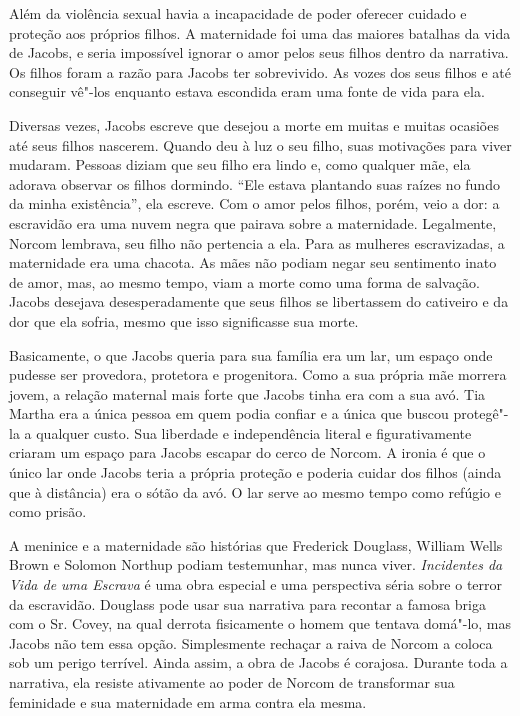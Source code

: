 Além da violência sexual havia a incapacidade de poder oferecer cuidado
e proteção aos próprios filhos. A maternidade foi uma das maiores
batalhas da vida de Jacobs, e seria impossível ignorar o amor pelos seus
filhos dentro da narrativa. Os filhos foram a razão para Jacobs ter
sobrevivido. As vozes dos seus filhos e até conseguir
vê"-los enquanto estava escondida eram uma fonte de vida para ela.

Diversas vezes, Jacobs escreve que desejou a morte em muitas e muitas
ocasiões até seus filhos nascerem. Quando deu à luz o seu filho,
suas motivações para viver mudaram. Pessoas diziam que seu filho era
lindo e, como qualquer mãe, ela adorava observar os filhos dormindo. ``Ele
estava plantando suas raízes no fundo da minha existência'', ela
escreve. Com o amor pelos filhos, porém, veio a dor: a escravidão era uma nuvem
negra que pairava sobre a maternidade. Legalmente, Norcom lembrava, seu
filho não pertencia a ela. Para as mulheres escravizadas, a maternidade
era uma chacota. As mães não podiam negar seu sentimento inato de amor,
mas, ao mesmo tempo, viam a morte como uma forma de salvação. Jacobs
desejava desesperadamente que seus filhos se libertassem do cativeiro e
da dor que ela sofria, mesmo que isso significasse sua morte.

Basicamente, o que Jacobs queria para sua família era um lar, um espaço
onde pudesse ser provedora, protetora e progenitora. Como a sua própria
mãe morrera jovem, a relação maternal mais forte que Jacobs tinha era
com a sua avó. Tia Martha era a única pessoa em quem podia confiar e a
única que buscou protegê"-la a qualquer custo. Sua liberdade e
independência literal e figurativamente criaram um espaço para Jacobs
escapar do cerco de Norcom. A ironia é que o único lar onde Jacobs teria
a própria proteção e poderia cuidar dos filhos (ainda que à distância)
era o sótão da avó. O lar serve ao mesmo tempo como refúgio e como
prisão.

A meninice e a maternidade são histórias que Frederick Douglass, William
Wells Brown e Solomon Northup podiam testemunhar, mas nunca viver.
\emph{Incidentes da Vida de uma Escrava} é uma obra especial e uma
perspectiva séria sobre o terror da escravidão. Douglass pode usar sua
narrativa para recontar a famosa briga com o Sr. Covey, na qual derrota
fisicamente o homem que tentava domá"-lo, mas Jacobs não tem essa opção.
Simplesmente rechaçar a raiva de Norcom a coloca sob um perigo terrível.
Ainda assim, a obra de Jacobs é corajosa. Durante toda a narrativa, ela
resiste ativamente ao poder de Norcom de transformar sua feminidade e
sua maternidade em arma contra ela mesma.

